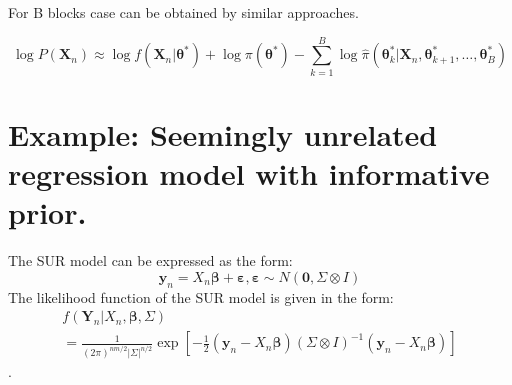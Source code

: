 \documentclass[
]{book}
\theoremstyle{definition}
\theoremstyle{definition}
\theoremstyle{definition}
\theoremstyle{remark}
\begin{document}
For B blocks case can be obtained by similar approaches.

\[
\log P\left(\boldsymbol{X}_{n}\right) \approx \log f\left(\boldsymbol{X}_{n} | \boldsymbol{\theta}^{*}\right)+\log \pi\left(\boldsymbol{\theta}^{*}\right)-\sum_{k=1}^{B} \log \hat{\pi}\left(\boldsymbol{\theta}_{k}^{*} | \boldsymbol{X}_{n}, \boldsymbol{\theta}_{k+1}^{*}, \ldots, \boldsymbol{\theta}_{B}^{*}\right)
\]

\hypertarget{example-seemingly-unrelated-regression-model-with-informative-prior.}{%
\section{Example: Seemingly unrelated regression model with informative prior.}\label{example-seemingly-unrelated-regression-model-with-informative-prior.}}

The SUR model can be expressed as the form:
\[
\boldsymbol{y}_{n}=X_{n} \boldsymbol{\beta}+\boldsymbol{\varepsilon}, \boldsymbol{\varepsilon} \sim N(\mathbf{0}, \Sigma \otimes I)
\]
The likelihood function of the SUR model is given in the form:
\[
\begin{array}{l}{f\left(\boldsymbol{Y}_{n} | X_{n}, \boldsymbol{\beta}, \Sigma\right)} \\ {=\frac{1}{(2 \pi)^{n m / 2}|\Sigma|^{n / 2}} \exp \left[-\frac{1}{2}\left(\boldsymbol{y}_{n}-X_{n} \boldsymbol{\beta}\right)(\Sigma \otimes I)^{-1}\left(\boldsymbol{y}_{n}-X_{n} \boldsymbol{\beta}\right)\right]}\end{array}
\]
.
\end{document}
